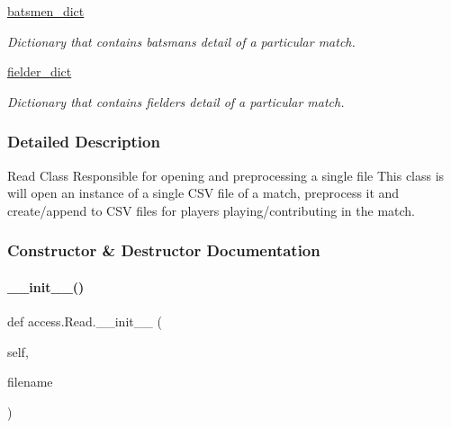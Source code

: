 \begin{DoxyCompactItemize}
\hyperlink{classaccess_1_1Read_a39dacaa1561558d474eb83c5d95f58f3}{batsmen\+\_\+dict}
\begin{DoxyCompactList}\small\item\em Dictionary that contains batsman\textquotesingle{}s detail of a particular match. \end{DoxyCompactList}\item 
\mbox{\label{classaccess_1_1Read_a7ec1d406e935ec18166d2b2dfe161f3c}} 
\hyperlink{classaccess_1_1Read_a7ec1d406e935ec18166d2b2dfe161f3c}{fielder\+\_\+dict}
\begin{DoxyCompactList}\small\item\em Dictionary that contains fielder\textquotesingle{}s detail of a particular match. \end{DoxyCompactList}\end{DoxyCompactItemize}


\subsubsection{Detailed Description}
\begin{DoxyVerb}Read Class
Responsible for opening and preprocessing a single file
This class is will open an instance of a single CSV file of a match, preprocess it and create/append to CSV files for players playing/contributing in the match.
\end{DoxyVerb}
 

\subsubsection{Constructor \& Destructor Documentation}
\mbox{\label{classaccess_1_1Read_a2b5862fb02d0f371039b129c549356fc}} 
\paragraph{\texorpdfstring{\+\_\+\+\_\+init\+\_\+\+\_\+()}{\_\_init\_\_()}}
{\footnotesize\ttfamily def access.\+Read.\+\_\+\+\_\+init\+\_\+\+\_\+ (\begin{DoxyParamCaption}\item[{}]{self,  }\item[{}]{filename }\end{DoxyParamCaption})}



